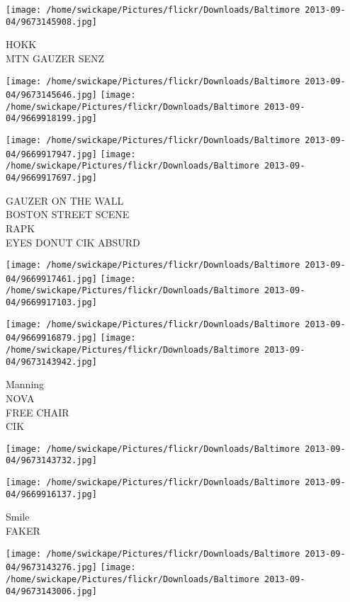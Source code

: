 \documentclass[10pt,letterpaper]{article}
\begin{document}
\vspace{0.25in}
\texttt{[image: /home/swickape/Pictures/flickr/Downloads/Baltimore 2013-09-04/9673145908.jpg]}

HOKK\\
MTN GAUZER SENZ\\
\pagebreak

\texttt{[image: /home/swickape/Pictures/flickr/Downloads/Baltimore 2013-09-04/9673145646.jpg]}
\texttt{[image: /home/swickape/Pictures/flickr/Downloads/Baltimore 2013-09-04/9669918199.jpg]}

\texttt{[image: /home/swickape/Pictures/flickr/Downloads/Baltimore 2013-09-04/9669917947.jpg]}
\texttt{[image: /home/swickape/Pictures/flickr/Downloads/Baltimore 2013-09-04/9669917697.jpg]}

GAUZER ON THE WALL\\
BOSTON STREET SCENE\\
RAPK\\
EYES DONUT CIK ABSURD\\
\pagebreak

\texttt{[image: /home/swickape/Pictures/flickr/Downloads/Baltimore 2013-09-04/9669917461.jpg]}
\texttt{[image: /home/swickape/Pictures/flickr/Downloads/Baltimore 2013-09-04/9669917103.jpg]}

\texttt{[image: /home/swickape/Pictures/flickr/Downloads/Baltimore 2013-09-04/9669916879.jpg]}
\texttt{[image: /home/swickape/Pictures/flickr/Downloads/Baltimore 2013-09-04/9673143942.jpg]}

Manning\\
NOVA\\
FREE CHAIR\\
CIK\\
\pagebreak

\texttt{[image: /home/swickape/Pictures/flickr/Downloads/Baltimore 2013-09-04/9673143732.jpg]}

\vspace{0.25in}
\texttt{[image: /home/swickape/Pictures/flickr/Downloads/Baltimore 2013-09-04/9669916137.jpg]}

Smile\\
FAKER\\
\pagebreak

\texttt{[image: /home/swickape/Pictures/flickr/Downloads/Baltimore 2013-09-04/9673143276.jpg]}
\texttt{[image: /home/swickape/Pictures/flickr/Downloads/Baltimore 2013-09-04/9673143006.jpg]}
\end{document}
